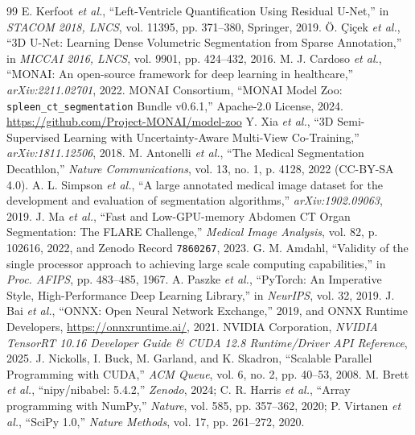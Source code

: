 \documentclass[10pt,twocolumn]{article}
\begin{document}
\begin{thebibliography}{99}
\footnotesize
{} E. Kerfoot \textit{et al.}, ``Left-Ventricle Quantification Using Residual U-Net,'' in \textit{STACOM 2018, LNCS}, vol. 11395, pp. 371--380, Springer, 2019.
 \"O. \c{C}i\c{c}ek \textit{et al.}, ``3D U-Net: Learning Dense Volumetric Segmentation from Sparse Annotation,'' in \textit{MICCAI 2016, LNCS}, vol. 9901, pp. 424--432, 2016.
 M. J. Cardoso \textit{et al.}, ``MONAI: An open-source framework for deep learning in healthcare,'' \textit{arXiv:2211.02701}, 2022.
 MONAI Consortium, ``MONAI Model Zoo: \texttt{spleen\_ct\_segmentation} Bundle v0.6.1,'' Apache-2.0 License, 2024. \url{https://github.com/Project-MONAI/model-zoo}
 Y. Xia \textit{et al.}, ``3D Semi-Supervised Learning with Uncertainty-Aware Multi-View Co-Training,'' \textit{arXiv:1811.12506}, 2018.
 M. Antonelli \textit{et al.}, ``The Medical Segmentation Decathlon,'' \textit{Nature Communications}, vol. 13, no. 1, p. 4128, 2022 (CC-BY-SA 4.0).
 A. L. Simpson \textit{et al.}, ``A large annotated medical image dataset for the development and evaluation of segmentation algorithms,'' \textit{arXiv:1902.09063}, 2019.
 J. Ma \textit{et al.}, ``Fast and Low-GPU-memory Abdomen CT Organ Segmentation: The FLARE Challenge,'' \textit{Medical Image Analysis}, vol. 82, p. 102616, 2022, and Zenodo Record \texttt{7860267}, 2023.
 G. M. Amdahl, ``Validity of the single processor approach to achieving large scale computing capabilities,'' in \textit{Proc. AFIPS}, pp. 483--485, 1967.
 A. Paszke \textit{et al.}, ``PyTorch: An Imperative Style, High-Performance Deep Learning Library,'' in \textit{NeurIPS}, vol. 32, 2019.
 J. Bai \textit{et al.}, ``ONNX: Open Neural Network Exchange,'' 2019, and ONNX Runtime Developers, \url{https://onnxruntime.ai/}, 2021.
 NVIDIA Corporation, \textit{NVIDIA TensorRT 10.16 Developer Guide \& CUDA 12.8 Runtime/Driver API Reference}, 2025.
 J. Nickolls, I. Buck, M. Garland, and K. Skadron, ``Scalable Parallel Programming with CUDA,'' \textit{ACM Queue}, vol. 6, no. 2, pp. 40--53, 2008.
 M. Brett \textit{et al.}, ``nipy/nibabel: 5.4.2,'' \textit{Zenodo}, 2024; C. R. Harris \textit{et al.}, ``Array programming with NumPy,'' \textit{Nature}, vol. 585, pp. 357--362, 2020; P. Virtanen \textit{et al.}, ``SciPy 1.0,'' \textit{Nature Methods}, vol. 17, pp. 261--272, 2020.

\end{thebibliography}
\end{document}
